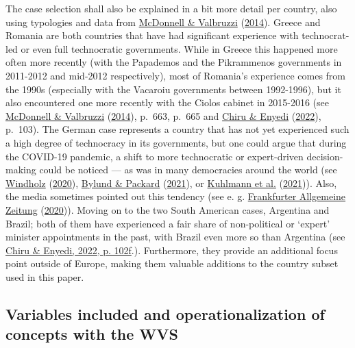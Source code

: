 \documentclass[
  12pt,
  english,
]{article}
\begin{document}
The case selection shall also be explained in a bit more detail per
country, also using typologies and data from
\protect\hyperlink{ref-mcdonnell2014defining}{McDonnell \& Valbruzzi}
(\protect\hyperlink{ref-mcdonnell2014defining}{2014}). Greece and
Romania are both countries that have had significant experience with
technocrat-led or even full technocratic governments. While in Greece
this happened more often more recently (with the Papademos and the
Pikrammenos governments in 2011-2012 and mid-2012 respectively), most of
Romania's experience comes from the 1990s (especially with the Vacaroiu
governments between 1992-1996), but it also encountered one more
recently with the Ciolos cabinet in 2015-2016 (see
\protect\hyperlink{ref-mcdonnell2014defining}{McDonnell \& Valbruzzi}
(\protect\hyperlink{ref-mcdonnell2014defining}{2014}), p.~663, p.~665
and \protect\hyperlink{ref-chiru2022wants}{Chiru \& Enyedi}
(\protect\hyperlink{ref-chiru2022wants}{2022}), p.~103). The German case
represents a country that has not yet experienced such a high degree of
technocracy in its governments, but one could argue that during the
COVID-19 pandemic, a shift to more technocratic or expert-driven
decision-making could be noticed --- as was in many democracies around
the world (see \protect\hyperlink{ref-windholz2020governing}{Windholz}
(\protect\hyperlink{ref-windholz2020governing}{2020}),
\protect\hyperlink{ref-bylund2021separation}{Bylund \& Packard}
(\protect\hyperlink{ref-bylund2021separation}{2021}), or
\protect\hyperlink{ref-kuhlmann2021tracing}{Kuhlmann et al.}
(\protect\hyperlink{ref-kuhlmann2021tracing}{2021})). Also, the media
sometimes pointed out this tendency (see e. g.
\protect\hyperlink{ref-FAZ2020virologen}{Frankfurter Allgemeine Zeitung}
(\protect\hyperlink{ref-FAZ2020virologen}{2020})). Moving on to the two
South American cases, Argentina and Brazil; both of them have
experienced a fair share of non-political or `expert' minister
appointments in the past, with Brazil even more so than Argentina (see
\protect\hyperlink{ref-chiru2022wants}{Chiru \& Enyedi, 2022, p.
102f}.). Furthermore, they provide an additional focus point outside of
Europe, making them valuable additions to the country subset used in
this paper.

\hypertarget{variables-included-and-operationalization-of-concepts-with-the-wvs}{%
\subsection{Variables included and operationalization of concepts with
the
WVS}\label{variables-included-and-operationalization-of-concepts-with-the-wvs}}
\end{document}
